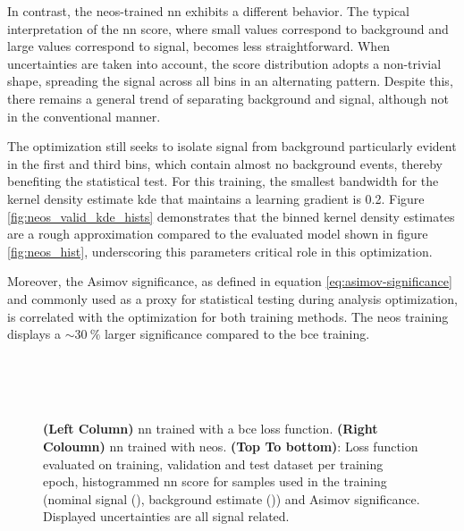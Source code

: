 In contrast, the \ac{neos}-trained \ac{nn} exhibits a different behavior. The typical interpretation of the \ac{nn} score, where small values correspond to background and large values correspond to signal, becomes less straightforward. When uncertainties are taken into account, the score distribution adopts a non-trivial shape, spreading the signal across all bins in an alternating pattern. Despite this, there remains a general trend of separating background and signal, although not in the conventional manner.

The optimization still seeks to isolate signal from background particularly evident in the first and third bins, which contain almost no background events, thereby benefiting the statistical test. For this training, the smallest bandwidth for the kernel density estimate \ac{kde} that maintains a learning gradient is 0.2. Figure \ref{fig:neos_valid_kde_hists} demonstrates that the binned kernel density estimates are a rough approximation compared to the evaluated model shown in figure \ref{fig:neos_hist}, underscoring this parameters critical role in this optimization.

Moreover, the Asimov significance, as defined in equation \ref{eq:asimov-significance} and commonly used as a proxy for statistical testing during analysis optimization, is correlated with the optimization for both training methods. The \ac{neos} training displays a $\sim\qty[]{30}{\percent}$ larger significance compared to the \ac{bce} training.

\begin{figure}
    \centering
     \label{fig:neos_validation_loss}\\
     \label{fig:neos_hist}\\
     \\
    \caption[]{\textbf{(Left Column)} \ac{nn} trained with a \ac{bce} loss function. \textbf{(Right Coloumn)} \ac{nn} trained with \ac{neos}.  \textbf{(Top To bottom)}: Loss function evaluated on training, validation and test dataset per training epoch, histogrammed \ac{nn} score for samples used in the training (nominal signal (), background estimate ()) and Asimov significance. Displayed uncertainties are all signal related.}
    \label{fig:training_metrics_validation}
\end{figure}



